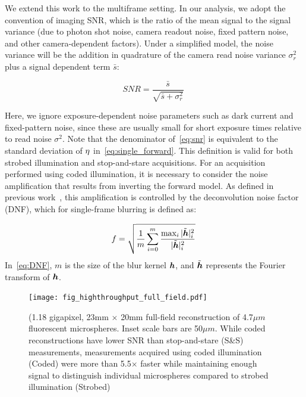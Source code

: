 We extend this work to the multiframe setting.
In our analysis, we adopt the convention of imaging SNR, which is the ratio of the mean signal to the signal variance (due to photon shot noise, camera readout noise, fixed pattern noise, and other camera-dependent factors). Under a simplified model, the noise variance will be the addition in quadrature of the camera read noise variance $\sigma^2_{r}$ plus a signal dependent term $\bar{s}$:

\begin{equation}
    \label{eq:snr}
    SNR = \frac{\bar{s}}{\sqrt{\bar{s} + \sigma^2_{r}}}\;
\end{equation}

Here, we ignore exposure-dependent noise parameters such as dark current and fixed-pattern noise, since these are usually small for short exposure times relative to read noise $\sigma^2$. Note that the denominator of~\eqref{eq:snr} is equivalent to the standard deviation of ${\eta}$ in~\eqref{eq:single_forward}. This definition is valid for both strobed illumination and stop-and-stare acquisitions. For an acquisition performed using coded illumination, it is necessary to consider the noise amplification that results from inverting the forward model. As defined in previous work~\cite{agrawal2009optimal}, this amplification is controlled by the deconvolution noise factor (DNF), which for single-frame blurring is defined as:

\begin{equation} \label{eq:DNF}
f = \sqrt{\frac{1}{m} \sum_{i=0}^m \frac{\max_i{|\tilde{\bm{h}}|_i^2}}{|\tilde{\bm{h}}|_i^2}}\:
\end{equation}
In~\eqref{eq:DNF}, $m$ is the size of the blur kernel $\bm{h}$, and $\tilde{\bm{h}}$ represents the Fourier transform of $\bm{h}$. %


\begin{figure}
  \centering
    \texttt{[image: fig\_highthroughput\_full\_field.pdf]}
    
  \caption{(1.18 gigapixel, 23mm $\times$ 20mm full-field reconstruction of 4.7$\mu m$ fluorescent microspheres. Inset scale bars are 50$\mu m$. While coded reconstructions have lower SNR than stop-and-stare (S\&S) measurements, measurements acquired using coded illumination (Coded) were more than 5.5$\times$ faster while maintaining enough signal to distinguish individual microspheres compared to strobed illumination (Strobed)}

\end{figure}

